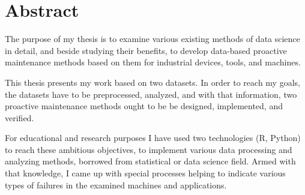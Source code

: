 \chapter*{Abstract}

The purpose of my thesis is to examine various existing methods of data science in detail, and beside studying their benefits, to develop data-based proactive maintenance methods based on them for industrial devices, tools, and machines.

This thesis presents my work based on two datasets. In order to reach my goals, the datasets have to be preprocessed, analyzed, and with that information, two proactive maintenance methods ought to be be designed, implemented, and verified.

For educational and research purposes I have used two technologies (R, Python) to reach these ambitious objectives, to implement various data processing and analyzing methods, borrowed from statistical or data science field. Armed with that knowledge, I came up with special processes helping to indicate various types of failures in the examined machines and applications.
